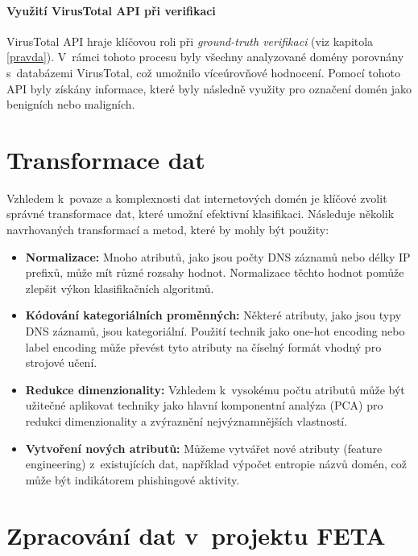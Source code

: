 \paragraph{Využití VirusTotal API při verifikaci}
VirusTotal API hraje klíčovou roli při \emph{ground-truth verifikaci} (viz kapitola \ref{pravda}). V~rámci tohoto procesu byly všechny analyzované domény porovnány s~databázemi VirusTotal, což umožnilo víceúrovňové hodnocení. Pomocí tohoto API byly získány informace, které byly následně využity pro označení domén jako benigních nebo maligních. \cite{petr}




\section{Transformace dat}
Vzhledem k~povaze a komplexnosti dat internetových domén je klíčové zvolit správné transformace dat, které umožní efektivní klasifikaci. Následuje několik navrhovaných transformací a metod, které by mohly být použity:

\begin{itemize}
    \item \textbf{Normalizace:} Mnoho atributů, jako jsou počty DNS záznamů nebo délky IP prefixů, může mít různé rozsahy hodnot. Normalizace těchto hodnot pomůže zlepšit výkon klasifikačních algoritmů.

    \item \textbf{Kódování kategoriálních proměnných:} Některé atributy, jako jsou typy DNS záznamů, jsou kategoriální. Použití technik jako one-hot encoding nebo label encoding může převést tyto atributy na číselný formát vhodný pro strojové učení.

    \item \textbf{Redukce dimenzionality:} Vzhledem k~vysokému počtu atributů může být užitečné aplikovat techniky jako hlavní komponentní analýza (PCA) pro redukci dimenzionality a zvýraznění nejvýznamnějších vlastností.

    \item \textbf{Vytvoření nových atributů:} Můžeme vytvářet nové atributy (feature engineering) z~existujících dat, například výpočet entropie názvů domén, což může být indikátorem phishingové aktivity.
\end{itemize}

\section{Zpracování dat v~projektu FETA}

